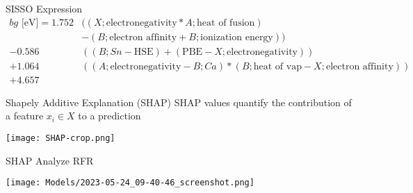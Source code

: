 \documentclass[10pt, aspectratio=169, presentation]{beamer}
\begin{document}
\begin{frame}[label={sec:org84588af}]{SISSO Expression}
\begin{align*}
bg\mbox{ [eV]} = 1.752 &((X;\mbox{electronegativity}*A;\mbox{heat of fusion})\\
                       &-(B;\mbox{electron affinity}+B;\mbox{ionization energy}))\\
                -0.586 &((B;Sn-\mbox{HSE})+(\mbox{PBE}-X;\mbox{electronegativity}))\\
                +1.064 &((A;\mbox{electronegativity}-B;Ca)*(B;\mbox{heat of vap}-X;\mbox{electron affinity}))\\
                +4.657
\end{align*}
\end{frame}

\begin{frame}[label={sec:orgc301ee3}]{Shapely Additive Explanation (SHAP)}
SHAP values quantify the contribution of a feature \(x_i \in X\) to a prediction
\autocite{lundberg-2017-unified-approac}

\begin{center}
\texttt{[image: SHAP-crop.png]}
\end{center}
\end{frame}

\begin{frame}[label={sec:org9fce750}]{SHAP Analyze RFR}
\begin{center}
\texttt{[image: Models/2023-05-24\_09-40-46\_screenshot.png]}
\end{center}
\end{frame}
\end{document}
